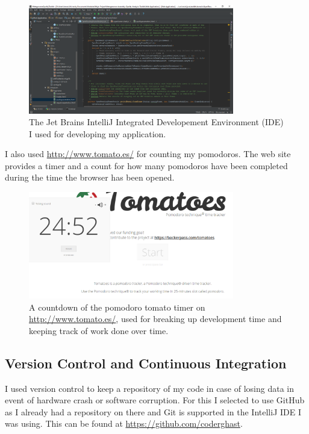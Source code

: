 \begin{figure}[H]
	\centering
\includegraphics[width=0.8\textwidth]{images/intellij}
\caption{The Jet Brains IntelliJ Integrated Developement Environment (IDE) I used for developing my application.}
\end{figure}

I also used \url{http://www.tomato.es/} for counting my pomodoros. The web site provides a timer and a count for how many pomodoros have been completed during the time the browser has been opened.

\begin{figure}[H]
	\centering
\includegraphics[width=0.8\textwidth]{images/tomatoes}
\caption{A countdown of the pomodoro tomato timer on \url{http://www.tomato.es/}, used for breaking up development time and keeping track of work done over time.}
\end{figure}

\subsection{Version Control and Continuous Integration}
I used version control to keep a repository of my code in case of losing data in event of hardware crash or software corruption. For this I selected to use GitHub as I already had a repository on there and Git is supported in the IntelliJ IDE I was using. This can be found at \url{https://github.com/coderghast}.

